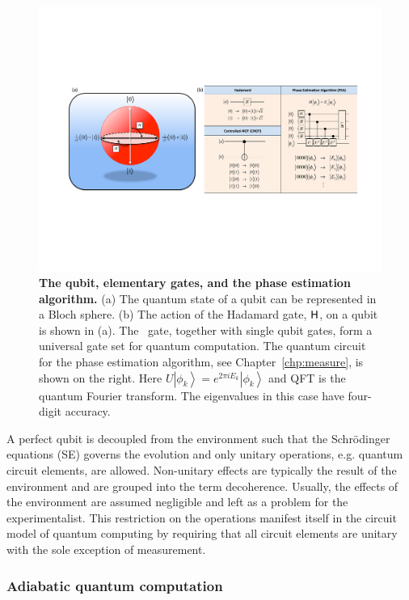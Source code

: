 \documentclass[11pt,oneside,final]{huthesis}%
\begin{document}
\begin{figure}
\begin{center}
\includegraphics[width=\columnwidth]{./figures/fig_gates}
\end{center}
\caption{\textbf{The qubit, elementary gates, and the phase estimation algorithm.} (a)
The quantum state of a qubit can be represented in a Bloch sphere. (b) The
action of the Hadamard gate, $\sf H$, on a qubit is shown in (a). The \cnot~gate,
together with single qubit gates, form a universal gate set for quantum computation. The quantum circuit
for the phase estimation algorithm, see Chapter~\ref{chp:measure}, is shown on the right. Here $U\left|
{\phi _k } \right\rangle  = e^{2\pi iE_k } \left| {\phi _k } \right\rangle $ and
QFT is the quantum Fourier transform. The eigenvalues in this case have four-digit
accuracy.}
\label{fig:basicgates}
\end{figure}


A perfect qubit is decoupled from the environment such that the Schr\"odinger equations (SE) governs the evolution and only unitary operations, e.g. quantum circuit elements, are allowed.  Non-unitary effects are typically the result of the environment and are grouped into the term decoherence.  Usually, the effects of the environment are assumed negligible and left as a problem for the experimentalist. This restriction on the operations manifest itself in the circuit model of quantum computing by requiring that all circuit elements are unitary with the sole exception of measurement. 

\subsubsection{Adiabatic quantum computation}\label{sec:adiabatic_intro}
\end{document}
